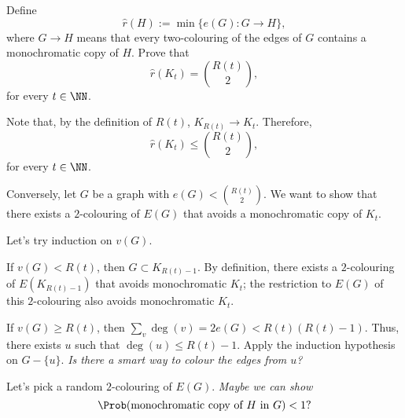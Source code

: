 \documentclass[10pt, a4paper]{article}
\begin{document}
\newpage
\begin{prob}
	Define \[
		\hat r(H) := \min \{e(G) : G \to H\},
	\]
	where $G \to H$ means that every two-colouring of the edges of $G$ contains a monochromatic copy of $H$.
	Prove that \[\hat r(K_t) = \binom{R(t)}{2},\] for every  $t \in \NN$.
\end{prob}
\begin{sk}
	Note that, by the definition of $R(t)$, $K_{R(t)} \to K_t$. Therefore, \[
		\hat r(K_t) \le \binom{R(t)}{2},
	\]
	for every $t \in \NN$.

	Conversely, let $G$ be a graph with $e(G) < \binom{R(t)}{2}$. We want to show that there exists a $2$-colouring of $E(G)$ that avoids a monochromatic copy of $K_t$.

	\begin{idea}[1]
		Let's try induction on $v(G)$.

		If $v(G) < R(t)$, then $G \subset K_{R(t) - 1}$. By definition, there exists a $2$-colouring of $E(K_{R(t)-1})$ that avoids monochromatic $K_t$; the restriction to $E(G)$ of this $2$-colouring also avoids monochromatic $K_t$.

		If $v(G) \ge R(t)$, then $\sum_{v} \deg(v) = 2e(G) < R(t)(R(t)-1)$. Thus, there exists $u$ such that $\deg(u) \le R(t) - 1$. Apply the induction hypothesis on $G - \{u\}$. \emph{Is there a smart way to colour the edges from $u$?}
	\end{idea}

	\begin{idea}[2]
		Let's pick a random $2$-colouring of $E(G)$. \emph{Maybe we can show $$\Prob(\text{monochromatic copy of } H \text{ in } G) < 1?$$}
	\end{idea}
\end{sk}
\end{document}
